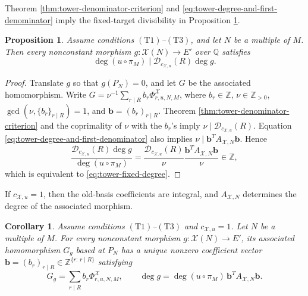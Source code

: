 \documentclass[12pt, letterpaper]{amsart}
\newtheorem{proposition}[theorem]{Proposition}
\newtheorem{corollary}[theorem]{Corollary}
\theoremstyle{definition}
\theoremstyle{remark}
\newcommand{\Q}{\mathbb Q}
\newcommand{\Z}{\mathbb Z}
\numberwithin{equation}{section}
\begin{document}
Theorem \ref{thm:tower-denominator-criterion} and
\eqref{eq:tower-degree-and-first-denominator} imply the fixed-target
divisibility in Proposition \ref{prop:tower-degree-consequences}.

\begin{proposition}\label{prop:tower-degree-consequences}
Assume conditions \hyperlink{tower-condition-T1}{\(\mathrm{(T1)}\)}--\hyperlink{tower-condition-T3}{\(\mathrm{(T3)}\)}, and let \(N\) be a
multiple of \(M\). Then
every nonconstant morphism \(g:\mathcal X(N)\to E'\) over \(\Q\) satisfies
\begin{equation}\label{eq:tower-fixed-degree}
        \deg(u\circ\pi_M)
        \mid
        \mathcal D_{c_{\mathcal X,u}}(R)\deg g.
\end{equation}
\end{proposition}

\begin{proof}
Translate \(g\) so that \(g(P_N)=0\), and let \(G\) be the associated
homomorphism. Write
\(G=\nu^{-1}\sum_{r\mid R}b_r\Phi^{\mathcal X}_{r,u,N,M}\),
where \(b_r\in\Z\), \(\nu\in\Z_{>0}\),
\(\gcd(\nu,\{b_r\}_{r\mid R})=1\), and
\(\boldsymbol b=(b_r)_{r\mid R}\).
Theorem \ref{thm:tower-denominator-criterion} and the coprimality of
\(\nu\) with the \(b_r\)'s imply
\(\nu\mid\mathcal D_{c_{\mathcal X,u}}(R)\). Equation
\eqref{eq:tower-degree-and-first-denominator} also implies
\(\nu\mid\boldsymbol b^{T}A_{\mathcal X,N}\boldsymbol b\). Hence
\[
        \frac{\mathcal D_{c_{\mathcal X,u}}(R)\deg g}{\deg(u\circ\pi_M)}
        =\frac{\mathcal D_{c_{\mathcal X,u}}(R)}{\nu}
        \frac{\boldsymbol b^{T}A_{\mathcal X,N}\boldsymbol b}{\nu}
        \in\Z,
\]
which is equivalent to \eqref{eq:tower-fixed-degree}.
\end{proof}

If \(c_{\mathcal X,u}=1\), then the old-basis coefficients are
integral, and \(A_{\mathcal X,N}\) determines the degree of the associated
morphism.

\begin{corollary}\label{cor:tower-integral-degree-form}
Assume conditions \hyperlink{tower-condition-T1}{\(\mathrm{(T1)}\)}--\hyperlink{tower-condition-T3}{\(\mathrm{(T3)}\)} and
\(c_{\mathcal X,u}=1\). Let \(N\) be a multiple of \(M\).
For every nonconstant morphism \(g:\mathcal X(N)\to E'\), its
associated homomorphism \(G_g\) based at \(P_N\) has a unique nonzero
coefficient vector \(\boldsymbol b=(b_r)_{r\mid R}\in
\Z^{\{r:\,r\mid R\}}\) satisfying
\[
        G_g=\sum_{r\mid R}b_r\Phi^{\mathcal X}_{r,u,N,M},
        \qquad
        \deg g=\deg(u\circ\pi_M)\,
        \boldsymbol b^{T}A_{\mathcal X,N}\boldsymbol b.
\]
\end{corollary}
\end{document}
